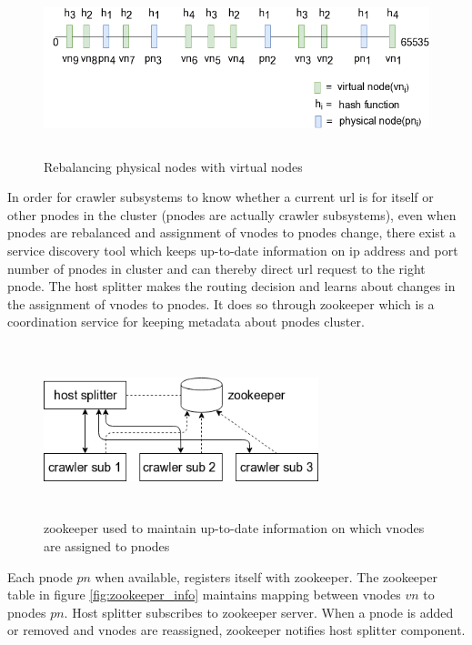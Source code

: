 \begin{figure}[h!]
  \centering
  \includegraphics[width=12cm,height=5cm,keepaspectratio]{../media/crawler/vnodesplit2.png}
  \caption{Rebalancing physical nodes with virtual nodes}
  \label{fig:vnodesplit2}
\end{figure}

\pagebreak

\noindent
In order for crawler subsystems to know whether a current url is for itself or other pnodes in the cluster
(pnodes are actually crawler subsystems), even when pnodes are rebalanced and assignment of vnodes to
pnodes change, there exist a service discovery tool which keeps up-to-date information on ip address
and port number of pnodes in cluster and can thereby direct url request to the right pnode. The host
splitter makes the routing decision and learns about changes in the assignment of vnodes to pnodes. It
does so through zookeeper\cite{zookeeper} which is a coordination service for keeping metadata about
pnodes cluster.

\begin{figure}[h!]
  \centering
  \includegraphics[width=8cm,height=5cm,keepaspectratio]{../media/crawler/zookeeper.png}
  \caption{zookeeper used to maintain up-to-date information on which vnodes are assigned to pnodes}
  \label{fig:zookeeper}
\end{figure}

\noindent
Each pnode $pn$ when available, registers itself with zookeeper. The zookeeper table in figure
\ref{fig:zookeeper_info} maintains mapping between vnodes $vn$ to pnodes $pn$. Host splitter subscribes
to zookeeper server. When a pnode is added or removed and vnodes are reassigned, zookeeper notifies host
splitter component.

